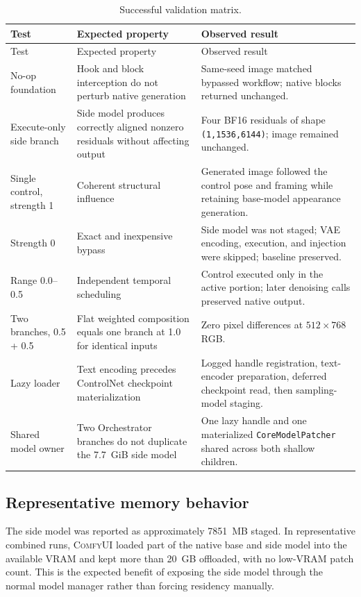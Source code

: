 \documentclass[11pt]{article}
\newcommand{\ComfyUI}{\textsc{ComfyUI}}
\newcommand{\code}[1]{\texttt{#1}}
\begin{document}
\begin{longtable}{@{}p{}p{}p{}@{}}
\caption{Successful validation matrix.}\\
\toprule
Test & Expected property & Observed result \\
\midrule
\endfirsthead
\toprule
Test & Expected property & Observed result \\
\midrule
\endhead
No-op foundation & Hook and block interception do not perturb native generation & Same-seed image matched bypassed workflow; native blocks returned unchanged. \\
Execute-only side branch & Side model produces correctly aligned nonzero residuals without affecting output & Four BF16 residuals of shape \code{(1,1536,6144)}; image remained unchanged. \\
Single control, strength 1 & Coherent structural influence & Generated image followed the control pose and framing while retaining base-model appearance generation. \\
Strength 0 & Exact and inexpensive bypass & Side model was not staged; VAE encoding, execution, and injection were skipped; baseline preserved. \\
Range 0.0--0.5 & Independent temporal scheduling & Control executed only in the active portion; later denoising calls preserved native output. \\
Two branches, 0.5 + 0.5 & Flat weighted composition equals one branch at 1.0 for identical inputs & Zero pixel differences at $512\times768$ RGB. \\
Lazy loader & Text encoding precedes ControlNet checkpoint materialization & Logged handle registration, text-encoder preparation, deferred checkpoint read, then sampling-model staging. \\
Shared model owner & Two Orchestrator branches do not duplicate the 7.7~GiB side model & One lazy handle and one materialized \code{CoreModelPatcher} shared across both shallow children. \\
\bottomrule
\end{longtable}

\subsection{Representative memory behavior}

The side model was reported as approximately 7851~MB staged. In representative combined runs, \ComfyUI{} loaded part of the native base and side model into the available VRAM and kept more than 20~GB offloaded, with no low-VRAM patch count. This is the expected benefit of exposing the side model through the normal model manager rather than forcing residency manually.
\end{document}
